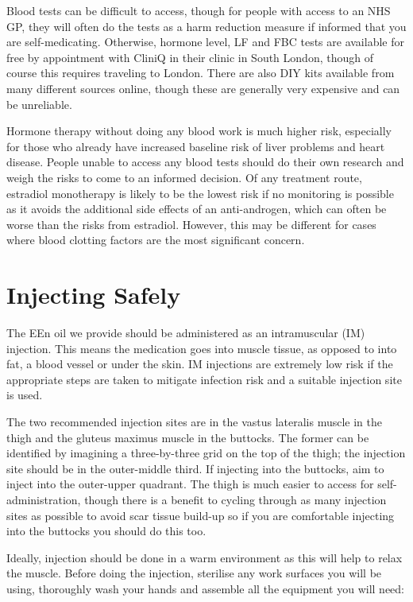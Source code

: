 \documentclass[twoside,a5paper]{article}
\begin{document}
Blood tests can be difficult to access, though for people with access
to an NHS GP, they will often do the tests as a harm reduction measure
if informed that you are self-medicating.  Otherwise, hormone level,
LF and FBC tests are available for free by appointment with CliniQ in
their clinic in South London, though of course this requires
traveling to London.  There are also DIY kits available from many
different sources online, though these are generally very expensive
and can be unreliable.

Hormone therapy without doing any blood work is much higher risk,
especially for those who already have increased baseline risk of liver
problems and heart disease.  People unable to access any blood tests
should do their own research and weigh the risks to come to an
informed decision.  Of any treatment route, estradiol monotherapy is
likely to be the lowest risk if no monitoring is possible as it avoids
the additional side effects of an anti-androgen, which can often be
worse than the risks from estradiol.  However, this may be different
for cases where blood clotting factors are the most significant
concern.

\section{Injecting Safely}

The EEn oil we provide should be administered as an intramuscular (IM)
injection.  This means the medication goes into muscle tissue, as
opposed to into fat, a blood vessel or under the skin.  IM injections
are extremely low risk if the appropriate steps are taken to mitigate
infection risk and a suitable injection site is used.

The two recommended injection sites are in the vastus lateralis muscle
in the thigh and the gluteus maximus muscle in the buttocks.  The
former can be identified by imagining a three-by-three grid on the top
of the thigh; the injection site should be in the outer-middle third.
If injecting into the buttocks, aim to inject into the outer-upper
quadrant.  The thigh is much easier to access for self-administration,
though there is a benefit to cycling through as many injection sites
as possible to avoid scar tissue build-up so if you are comfortable
injecting into the buttocks you should do this too.

Ideally, injection should be done in a warm environment as this will
help to relax the muscle.  Before doing the injection, sterilise any
work surfaces you will be using, thoroughly wash your hands and
assemble all the equipment you will need:
\end{document}
